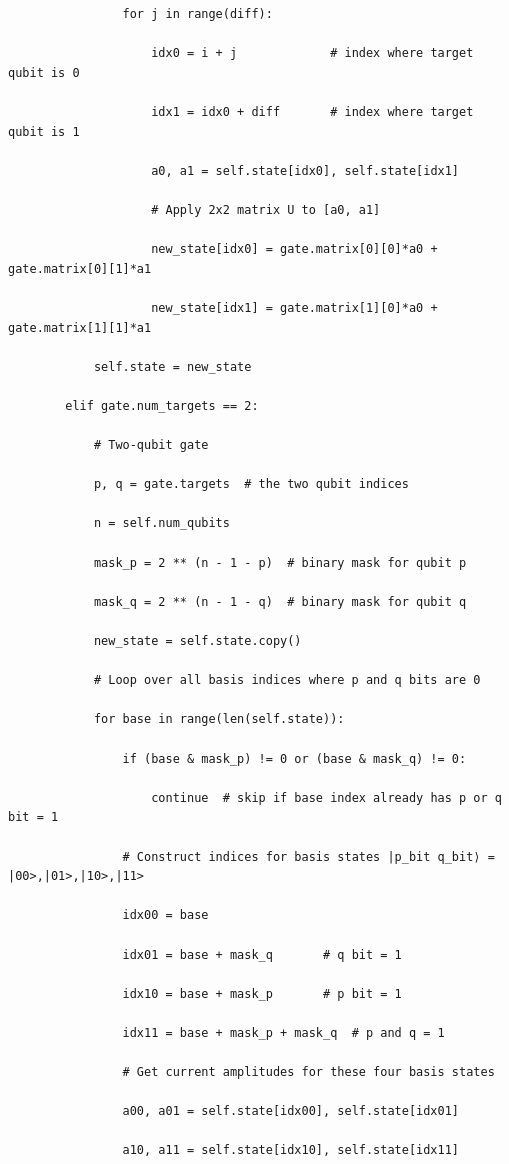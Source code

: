 \documentclass{beamer}
\begin{document}
\begin{frame}
\begin{verbatim}
                for j in range(diff):

                    idx0 = i + j             # index where target qubit is 0

                    idx1 = idx0 + diff       # index where target qubit is 1

                    a0, a1 = self.state[idx0], self.state[idx1]

                    # Apply 2x2 matrix U to [a0, a1]

                    new_state[idx0] = gate.matrix[0][0]*a0 + gate.matrix[0][1]*a1

                    new_state[idx1] = gate.matrix[1][0]*a0 + gate.matrix[1][1]*a1

            self.state = new_state

        elif gate.num_targets == 2:

            # Two-qubit gate

            p, q = gate.targets  # the two qubit indices

            n = self.num_qubits

            mask_p = 2 ** (n - 1 - p)  # binary mask for qubit p

            mask_q = 2 ** (n - 1 - q)  # binary mask for qubit q

            new_state = self.state.copy()

            # Loop over all basis indices where p and q bits are 0

            for base in range(len(self.state)):

                if (base & mask_p) != 0 or (base & mask_q) != 0:

                    continue  # skip if base index already has p or q bit = 1

                # Construct indices for basis states |p_bit q_bit⟩ = |00>,|01>,|10>,|11>

                idx00 = base

                idx01 = base + mask_q       # q bit = 1

                idx10 = base + mask_p       # p bit = 1

                idx11 = base + mask_p + mask_q  # p and q = 1

                # Get current amplitudes for these four basis states

                a00, a01 = self.state[idx00], self.state[idx01]

                a10, a11 = self.state[idx10], self.state[idx11]


\end{verbatim}
\end{frame}
\end{document}
